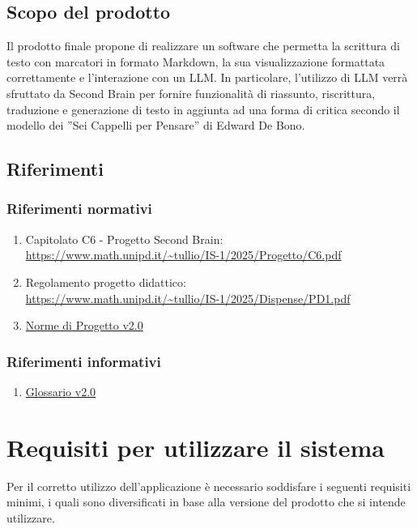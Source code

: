 \documentclass[a4paper,10pt]{article}
\begin{document}
\subsection{Scopo del prodotto}
Il prodotto finale propone di realizzare un software che permetta la scrittura di testo con marcatori in formato Markdown, la sua visualizzazione formattata correttamente e l’interazione con un LLM. In particolare, l’utilizzo di LLM verrà sfruttato da Second Brain per fornire funzionalità di riassunto, riscrittura, traduzione e generazione di testo in aggiunta ad una forma di critica secondo il modello dei ”Sei Cappelli per Pensare” di Edward De Bono. 

\subsection{Riferimenti}
\subsubsection{Riferimenti normativi}
\begin{enumerate}
    \item Capitolato C6 - Progetto Second Brain: \\ \url{https://www.math.unipd.it/~tullio/IS-1/2025/Progetto/C6.pdf}
    \item Regolamento progetto didattico: \\ \url{https://www.math.unipd.it/~tullio/IS-1/2025/Dispense/PD1.pdf}
    \item \href{https://tool-8.github.io/Documentazione-SWE/pb/Norme_di_Progetto_v2.0.pdf}{Norme di Progetto v2.0}
\end{enumerate}
\subsubsection{Riferimenti informativi}
\begin{enumerate}
    \item \href{https://tool-8.github.io/Documentazione-SWE/glossario/Glossario.pdf}{Glossario v2.0} 
\end{enumerate}

\section{Requisiti per utilizzare il sistema}
Per il corretto utilizzo dell'applicazione è necessario soddisfare i seguenti requisiti minimi, i quali sono diversificati in base alla versione del prodotto che si intende utilizzare. 
\end{document}
